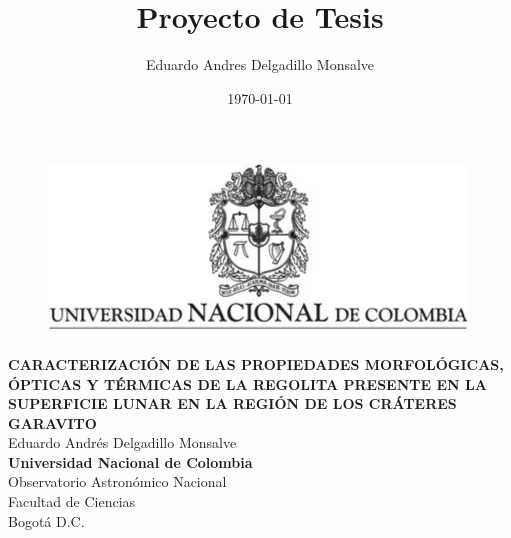 \documentclass[12pt]{article}
\title{Proyecto de Tesis}
\author{Eduardo Andres Delgadillo Monsalve}
\date{\today}
\begin{document}
\renewcommand{\tablename}{Tabla}%
\renewcommand{\listtablename}{Índice de tablas}
\begin{titlepage}
    \centering
    \thispagestyle{empty}
    \begin{center}
        \begin{figure}
        \centering%
        \includegraphics{images/EscudoUN.png}
    \end{figure}
    
    \vspace{3cm}
    
    \textbf{CARACTERIZACIÓN DE LAS PROPIEDADES MORFOLÓGICAS, ÓPTICAS Y 
    TÉRMICAS DE LA REGOLITA PRESENTE EN LA SUPERFICIE LUNAR EN LA REGIÓN 
    DE LOS CRÁTERES GARAVITO}\\[1in]    
    Eduardo Andrés Delgadillo Monsalve \\  [3in]

   \textbf{Universidad Nacional de Colombia}\\
   Observatorio Astronómico Nacional\\
   Facultad de Ciencias\\
   Bogotá D.C.\\
   \the\year
    \end{center}
\end{titlepage}
\end{document}
